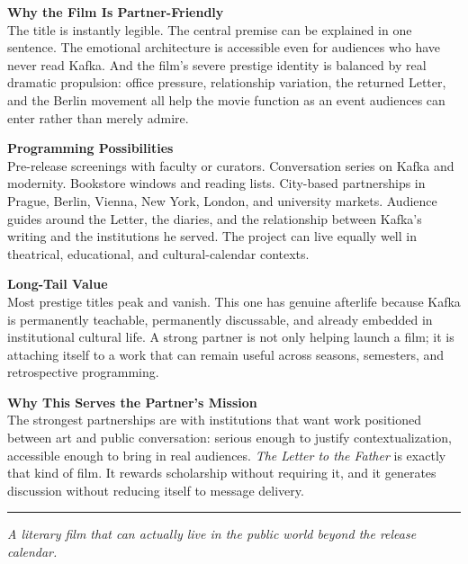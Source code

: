 \documentclass[11pt,letterpaper]{article}
\begin{document}
\vspace{2pt}

\textbf{Why the Film Is Partner-Friendly}\\
The title is instantly legible. The central premise can be explained in one sentence. The emotional architecture is accessible even for audiences who have never read Kafka. And the film's severe prestige identity is balanced by real dramatic propulsion: office pressure, relationship variation, the returned Letter, and the Berlin movement all help the movie function as an event audiences can enter rather than merely admire.

\vspace{2pt}

\textbf{Programming Possibilities}\\
Pre-release screenings with faculty or curators. Conversation series on Kafka and modernity. Bookstore windows and reading lists. City-based partnerships in Prague, Berlin, Vienna, New York, London, and university markets. Audience guides around the Letter, the diaries, and the relationship between Kafka's writing and the institutions he served. The project can live equally well in theatrical, educational, and cultural-calendar contexts.

\vspace{2pt}

\textbf{Long-Tail Value}\\
Most prestige titles peak and vanish. This one has genuine afterlife because Kafka is permanently teachable, permanently discussable, and already embedded in institutional cultural life. A strong partner is not only helping launch a film; it is attaching itself to a work that can remain useful across seasons, semesters, and retrospective programming.

\vspace{2pt}

\textbf{Why This Serves the Partner's Mission}\\
The strongest partnerships are with institutions that want work positioned between art and public conversation: serious enough to justify contextualization, accessible enough to bring in real audiences. \textit{The Letter to the Father} is exactly that kind of film. It rewards scholarship without requiring it, and it generates discussion without reducing itself to message delivery.

\vspace{4pt}
\textcolor{sectionrule}{\rule{\textwidth}{0.5pt}}
\vspace{2pt}
\begin{center}
{\small\color{kafkalight}\textit{A literary film that can actually live in the public world beyond the release calendar.}}
\end{center}
\end{document}
